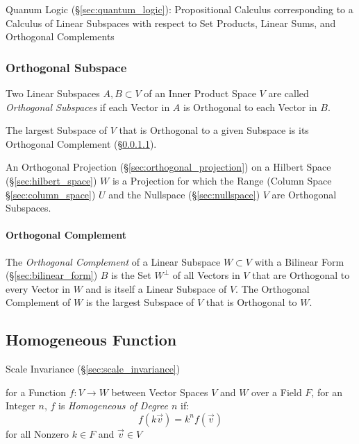 \fist Quanum Logic (\S\ref{sec:quantum_logic}): Propositional Calculus
corresponding to a Calculus of Linear Subspaces with respect to Set Products,
Linear Sums, and Orthogonal Complements



\subsubsection{Orthogonal Subspace}\label{sec:orthogonal_subspace}

Two Linear Subspaces $A, B \subset V$ of an Inner Product Space $V$ are called
\emph{Orthogonal Subspaces} if each Vector in $A$ is Orthogonal to each Vector
in $B$.

The largest Subspace of $V$ that is Orthogonal to a given Subspace is its
Orthogonal Complement (\S\ref{sec:orthogonal_complement}).

An Orthogonal Projection (\S\ref{sec:orthogonal_projection}) on a Hilbert Space
(\S\ref{sec:hilbert_space}) $W$ is a Projection for which the Range (Column
Space \S\ref{sec:column_space}) $U$ and the Nullspace (\S\ref{sec:nullspace})
$V$ are Orthogonal Subspaces.



\paragraph{Orthogonal Complement}\label{sec:orthogonal_complement}\hfill

The \emph{Orthogonal Complement} of a Linear Subspace $W \subset V$ with a
Bilinear Form (\S\ref{sec:bilinear_form}) $B$ is the Set $W^\bot$ of all
Vectors in $V$ that are Orthogonal to every Vector in $W$ and is itself a
Linear Subspace of $V$. The Orthogonal Complement of $W$ is the largest
Subspace of $V$ that is Orthogonal to $W$.



\subsection{Homogeneous Function}\label{sec:homogeneous_function}

Scale Invariance (\S\ref{sec:scale_invariance})

for a Function $f : V \rightarrow W$ between Vector Spaces $V$ and $W$ over a
Field $F$, for an Integer $n$, $f$ is \emph{Homogeneous of Degree $n$} if:
\[
  f(k{\vec{v}}) = k^n f(\vec{v})
\]
for all Nonzero $k \in F$ and $\vec{v} \in V$

